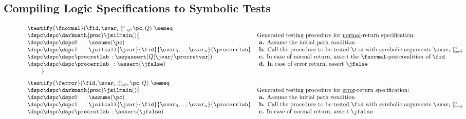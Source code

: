 \subsection{Compiling \jsil Logic Specifications to Symbolic Tests}
\label{specs:to:symbolic:tests}

\begin{figure}
{\scriptsize
$$
\begin{array}{ll}
\testify{\fnormal}(\fid, \svar_i\mid_{i=0}^n, \pc, Q) \ \semeq & \\
         \dspc \dspc  \darkmath{\sf proc} \jsilmain () \{ 
         &  \text{Generated testing procedure for \underline{normal}-return specification:} \\ 
             \dspc \dspc \dspc 0_{\phantom{\sf nm}}:  \assume(\pc) 
                   & \text{  {\bf a.} Assume the initial path condition} \\ 
             \dspc \dspc \dspc 1_{\phantom{\sf nm}}: \jsilcall{\jvar}{\fid}{\svar_0, ..., \svar_n}{\procerrlab}  
                   & \text{  {\bf b.} Call the procedure to be tested $\fid$ with symbolic arguments $\svar_i\mid_{i=0}^n$} \\ 
             \dspc \dspc \dspc \procretlab \, : \sepassert(Q[\jvar/\procretvar])
                  & \text{  {\bf c.}  In case of normal return, assert the $\fnormal$-postcondition of $\fid$} \\ 
             \dspc \dspc \dspc \procerrlab \, \, \, : \assert(\jfalse)
                  & \text{  {\bf d.}  In case of error return, assert $\jfalse$} \\ 
         \ \ \ \ \ \ \ \} &\\[8pt]
%
\testify{\ferror}(\fid, \svar_i\mid_{i=0}^n, \pc, Q) \ \semeq & \\
         \dspc \dspc  \darkmath{\sf proc} \jsilmain () \{ 
         &  \text{Generated testing procedure for \underline{error}-return specification:} \\ 
            \dspc \dspc \dspc 0_{\phantom{\sf nm}}:  \assume(\pc)   
                   & \text{  {\bf a.} Assume the initial path condition} \\ 
             \dspc \dspc \dspc 1_{\phantom{\sf nm}}: \jsilcall{\jvar}{\fid}{\svar_0, ..., \svar_n}{\procerrlab}  
                   & \text{  {\bf b.} Call the procedure to be tested $\fid$ with symbolic arguments $\svar_i\mid_{i=0}^n$} \\ 
             \dspc \dspc \dspc \procretlab \, : \assert(\jfalse)
                  & \text{  {\bf c.}  In case of normal return, assert $\jfalse$} \\ 

\end{array}$$}
\end{figure}
